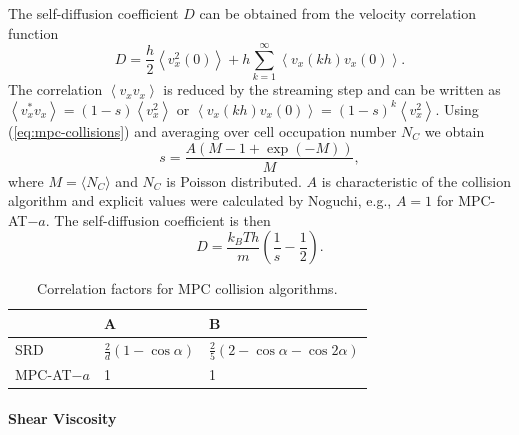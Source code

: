 \documentclass[8.5pt,twoside,twocolumn]{article}
\begin{document}
The self-diffusion coefficient $D$ can be obtained from  the velocity correlation function
%
\begin{equation}
D= \frac{h}{2} \left\langle v_x^2(0) \right\rangle + h \sum_{k=1}^{\infty} \left\langle v_x(kh) v_x(0) \right\rangle .
\end{equation}
%
The correlation $\left\langle v_x v_x \right\rangle$ is reduced by the streaming step and can be written as $\left\langle v_x^* v_x \right\rangle = (1-s) \left\langle v_x^2 \right\rangle$ or $\left\langle v_x(kh) v_x(0) \right\rangle=(1-s)^k \left\langle v_x^2 \right\rangle$.
%
%
%
%
Using (\ref{eq:mpc-collisions}) and averaging over cell occupation number $N_C$ we obtain
%
\begin{equation}
s = \frac{A\left(M-1+\exp(-M)\right)}{M} ,
\end{equation}
%
where $M=\langle N_C \rangle$ and $N_C$ is Poisson distributed. $A$ is characteristic of the collision algorithm and explicit values were calculated by Noguchi\cite{Noguchi:2008}, e.g., $A=1$ for MPC-AT$-a$. The self-diffusion coefficient is then
%
\begin{equation}
  D %
  = \frac{k_B T h}{m} \left( \frac{1}{s} - \frac{1}{2} \right) .
\end{equation}

\begin{table}\centering
\begin{tabular}{l|l|l}
  \hline
  & A & B \\
  \hline
  SRD & $\frac{2}{d}(1-\cos\alpha)$ & $\frac{2}{5}(2-\cos\alpha-\cos2\alpha)$ \\
  MPC-AT$-a$ & 1 & 1 \\
  \hline
\end{tabular}
\caption{Correlation factors for MPC collision algorithms.}
\label{tab:mpc-correlation-factors}
\end{table}

\paragraph{Shear Viscosity}
\end{document}
